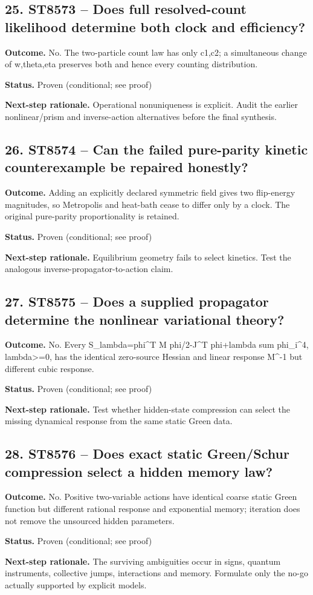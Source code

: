 \subsection*{25. ST8573 -- Does full resolved-count likelihood determine both clock and efficiency?}
\noindent\textbf{Outcome.} No. The two-particle count law has only c1,c2; a simultaneous change of w,theta,eta preserves both and hence every counting distribution.\par
\noindent\textbf{Status.} Proven (conditional; see proof)\par
\noindent\textbf{Next-step rationale.} Operational nonuniqueness is explicit. Audit the earlier nonlinear/prism and inverse-action alternatives before the final synthesis.\par\medskip
\subsection*{26. ST8574 -- Can the failed pure-parity kinetic counterexample be repaired honestly?}
\noindent\textbf{Outcome.} Adding an explicitly declared symmetric field gives two flip-energy magnitudes, so Metropolis and heat-bath cease to differ only by a clock. The original pure-parity proportionality is retained.\par
\noindent\textbf{Status.} Proven (conditional; see proof)\par
\noindent\textbf{Next-step rationale.} Equilibrium geometry fails to select kinetics. Test the analogous inverse-propagator-to-action claim.\par\medskip
\subsection*{27. ST8575 -- Does a supplied propagator determine the nonlinear variational theory?}
\noindent\textbf{Outcome.} No. Every S\_lambda=phi\textasciicircum{}T M phi/2-J\textasciicircum{}T phi+lambda sum phi\_i\textasciicircum{}4, lambda\textgreater{}=0, has the identical zero-source Hessian and linear response M\textasciicircum{}-1 but different cubic response.\par
\noindent\textbf{Status.} Proven (conditional; see proof)\par
\noindent\textbf{Next-step rationale.} Test whether hidden-state compression can select the missing dynamical response from the same static Green data.\par\medskip
\subsection*{28. ST8576 -- Does exact static Green/Schur compression select a hidden memory law?}
\noindent\textbf{Outcome.} No. Positive two-variable actions have identical coarse static Green function but different rational response and exponential memory; iteration does not remove the unsourced hidden parameters.\par
\noindent\textbf{Status.} Proven (conditional; see proof)\par
\noindent\textbf{Next-step rationale.} The surviving ambiguities occur in signs, quantum instruments, collective jumps, interactions and memory. Formulate only the no-go actually supported by explicit models.\par\medskip
